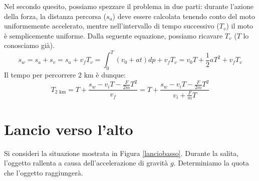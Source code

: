 Nel secondo quesito, possiamo spezzare il problema in due parti: durante
l'azione della forza, la distanza percorsa ($s_a$) deve essere calcolata tenendo
conto del moto uniformemente accelerato, mentre nell'intervallo di tempo
successivo ($T_v$) il moto è semplicemente uniforme. Dalla seguente equazione,
possiamo ricavare $T_v$ ($T$ lo conosciamo già).
\[ s_w = s_a + s_v = s_a + v_fT_v = \int_{0}^{T}(v_0 + at)dp + v_fT_v = v_0T + \frac{1}{2}aT^2 + v_fT_v \]
Il tempo per percorrere $2\text{ km}$ è dunque:
\[ T_{2\text{ km}} = T + \frac{s_w - v_iT - \frac{F}{2m}T^2}{v_f} = T + \frac{s_w - v_iT - \frac{F}{2m}T^2}{v_i + \frac{F}{m}T} \]

\section{Lancio verso l'alto}
Si consideri la situazione mostrata in Figura \ref{lanciobasso}.
Durante la salita, l'oggetto rallenta a causa dell'accelerazione di gravità $g$.
Determiniamo la quota che l'oggetto raggiungerà.

